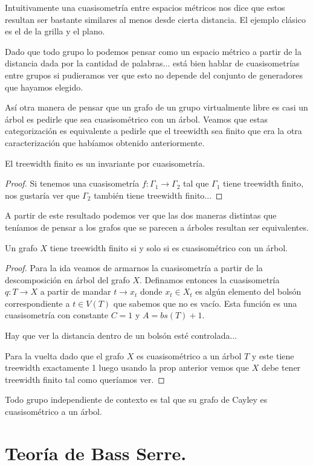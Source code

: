 \documentclass[tesis.tex]{subfiles}
\begin{document}
Intuitivamente una cuasisometría entre espacios métricos nos dice que estos resultan ser bastante similares al menos desde cierta distancia. El ejemplo clásico es el de la grilla y el plano.

Dado que todo grupo lo podemos pensar como un espacio métrico a partir de la distancia dada por la cantidad de palabras... está bien hablar de cuasisometrías entre grupos si pudieramos ver que esto no depende del conjunto de generadores que hayamos elegido.



Así otra manera de pensar que un grafo de un grupo virtualmente libre es casi un árbol es pedirle que sea cuasisométrico con un árbol. Veamos que estas categorización es equivalente a pedirle que el treewidth sea finito que era la otra caracterización que habíamos obtenido anteriormente.

\begin{lema}
	El treewidth finito es un invariante por cuasisometría.
\end{lema}
\begin{proof}
Si tenemos una cuasisometría $f:\Gamma_1 \to \Gamma_2$ tal que $\Gamma_1$ tiene treewidth finito, nos gustaría ver que $\Gamma_2$ también tiene treewidth finito...
\end{proof}

A partir de este resultado podemos ver que las dos maneras distintas que teníamos de pensar a los grafos que se parecen a árboles resultan ser equivalentes.

\begin{prop}
	Un grafo $X$ tiene treewidth finito si y solo si es cuasisométrico con un árbol.
\end{prop}
\begin{proof}
	
Para la ida veamos de armarnos la cuasisometría a partir de la descomposición en árbol del grafo $X$. Definamos entonces la cuasisometría $q: T \to X$ a partir de mandar $t \to x_t$ donde $x_t \in X_t$ es algún elemento del bolsón correspondiente a $t \in V(T)$ que sabemos que no es vacío. Esta función es una cuasisometría con constante $C=1$ y $A = bs(T) + 1$.

Hay que ver la distancia dentro de un bolsón esté controlada...


Para la vuelta dado que el grafo $X$ es cuasisométrico a un árbol $T$ y este tiene treewidth exactamente 1 luego usando la prop anterior vemos que $X$ debe tener treewidth finito tal como queríamos ver.
\end{proof}

\begin{coro}
	Todo grupo independiente de contexto es tal que su grafo de Cayley es cuasisométrico a un árbol.
\end{coro}

\section{Teoría de Bass Serre.}



	
	
	
	
\end{document}
